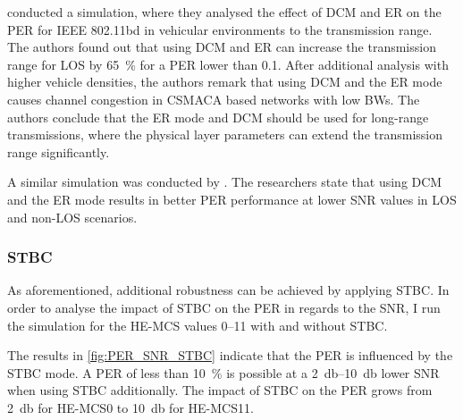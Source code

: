 \textcite{jacob_system-level_2020} conducted a simulation, where they analysed the effect of \ac{DCM} and \ac{ER} on the \ac{PER} for
IEEE 802.11bd in vehicular environments to the transmission range.
The authors found out that using \ac{DCM} and \ac{ER} can
increase the transmission range for \ac{LOS} by \SI{65}{\percent} for a \ac{PER} lower than \num{0.1}.
After additional analysis with higher
vehicle densities, the authors remark that using \ac{DCM} and the \ac{ER} mode causes channel congestion in \ac{CSMACA} based
networks with low \acp{BW}.
The authors conclude that the \ac{ER} mode and \ac{DCM} should be used for long-range transmissions, where
the physical layer parameters can extend the transmission range significantly.

A similar simulation was conducted by \textcite{triwinarko_phy_2021}.
The researchers state that using \ac{DCM} and the
\ac{ER} mode results in better \ac{PER} performance at lower \ac{SNR} values in \ac{LOS} and non-\ac{LOS} scenarios.

\subsubsection*{\acf{STBC}}
As aforementioned, additional robustness can be achieved by applying \ac{STBC}.
In order to analyse the impact of \ac{STBC} on the \ac{PER} in regards to the \ac{SNR},
I run the simulation for the \ac{HE}-\ac{MCS} values \numrange{0}{11} with and without \ac{STBC}.

The results in \autoref{fig:PER_SNR_STBC} indicate that the \ac{PER} is influenced
by the \ac{STBC} mode. A \ac{PER} of less than \SI{10}{\percent} is possible at a \SIrange{2}{10}{\decibel} lower \ac{SNR} when using \ac{STBC} additionally.
The impact of \ac{STBC} on the \ac{PER} grows from \SI{2}{\decibel} for \ac{HE}-\ac{MCS}\num{0} to \SI{10}{\decibel} for \ac{HE}-\ac{MCS}\num{11}.

